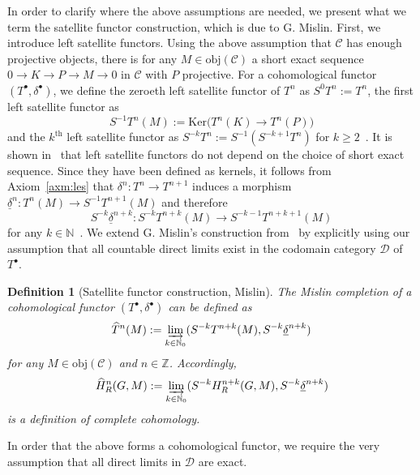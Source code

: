 \documentclass[12pt, a4paper]{article}
\numberwithin{equation}{section}
\newtheorem{defn}[thm]{Definition}
\theoremstyle{empty}
\theoremstyle{nonumberplain}
\begin{document}
In order to clarify where the above assumptions are needed, we present what we term the satellite functor construction, which is due to G.\! Mislin. First, we introduce left satellite functors. Using the above assumption that $\mathcal{C}$ has enough projective objects, there is for any $M \in \mathrm{obj}(\mathcal{C})$ a short exact sequence $0 \rightarrow K \rightarrow P \rightarrow M \rightarrow 0$ in $\mathcal{C}$ with $P$ projective. For a cohomological functor $(T^{\bullet}, \delta^{\bullet})$, we define the zeroeth left satellite functor of $T^n$ as $S^0T^n := T^n$, the first left satellite functor as
\[ S^{-1}T^n(M) := \mathrm{Ker}\big(T^n(K) \rightarrow T^n(P)\big) \]
and the $k^{\text{th}}$ left satellite functor as $S^{-k}T^n := S^{-1}(S^{-k+1}T^n)$ for $k \geq 2$~\cite[p.~36]{car56}. It is shown in~\cite[Section~III.1]{car56} that left satellite functors do not depend on the choice of short exact sequence. Since they have been defined as kernels, it follows from Axiom~\ref{axm:les} that $\delta^n: T^n \rightarrow T^{n+1}$ induces a morphism $\underline{\delta}^n: T^n(M) \rightarrow S^{-1}T^{n+1}(M)$ and therefore
\[ S^{-k}\underline{\delta}^{n+k}: S^{-k}T^{n+k}(M) \rightarrow S^{-k-1}T^{n+k+1}(M) \]
for any $k \in \mathbb{N}$~\cite[p.~207--208]{kro95}. We extend G.\! Mislin's construction from~\cite[p.~293]{mis94} by explicitly using our assumption that all countable  direct limits exist in the codomain category $\mathcal{D}$ of $T^{\bullet}$.

\begin{defn}[Satellite functor construction, Mislin]
The Mislin completion of a cohomological functor $(T^{\bullet}, \delta^{\bullet})$ can be defined as
\[ \widehat{T}^n(M) := \varinjlim_{k \in \mathbb{N}_0} (S^{-k}T^{n+k}(M), S^{-k}\underline{\delta}^{n+k}) \]
for any $M \in \mathrm{obj}(\mathcal{C})$ and $n \in \mathbb{Z}$. Accordingly,
\[ \widehat{H}_R^n(G, M) := \varinjlim_{k \in \mathbb{N}_0} (S^{-k}H_R^{n+k}(G, M), S^{-k}\underline{\delta}^{n+k}) \]
is a definition of complete cohomology.
\end{defn}

In order that the above forms a cohomological functor, we require the very assumption that all direct limits in $\mathcal{D}$ are exact. \\
\end{document}
